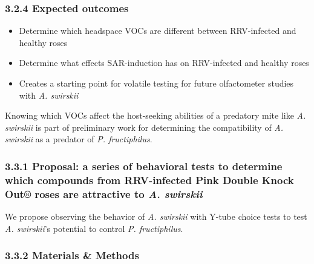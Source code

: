 \documentclass[12pt,final,CPage]{ufthesis}
\begin{document}
{  \hypertarget{expected-outcomes}{%
  \subsubsection{3.2.4 Expected outcomes}\label{expected-outcomes}}
  \begin{itemize}
  \item
    Determine which headspace VOCs are different between RRV-infected and healthy roses
  \item
    Determine what effects SAR-induction has on RRV-infected and healthy roses
  \item
    Creates a starting point for volatile testing for future olfactometer studies with \emph{A. swirskii}
  \end{itemize}
  Knowing which VOCs affect the host-seeking abilities of a predatory mite like \emph{A. swirskii} is part of preliminary work for determining the compatibility of \emph{A. swirskii} as a predator of \emph{P. fructiphilus}.

  \hypertarget{proposal-a-series-of-behavioral-tests-to-determine-which-compounds-from-rrv-infected-pink-double-knock-out-roses-are-attractive-to-a.-swirskii}{%
  \subsubsection{\texorpdfstring{3.3.1 Proposal: a series of behavioral tests to determine which compounds from RRV-infected Pink Double Knock Out® roses are attractive to \emph{A. swirskii}}{3.3.1 Proposal: a series of behavioral tests to determine which compounds from RRV-infected Pink Double Knock Out® roses are attractive to A. swirskii}}\label{proposal-a-series-of-behavioral-tests-to-determine-which-compounds-from-rrv-infected-pink-double-knock-out-roses-are-attractive-to-a.-swirskii}}

  We propose observing the behavior of \emph{A. swirskii} with Y-tube choice tests to test \emph{A. swirskii}'s potential to control \emph{P. fructiphilus}.

  \hypertarget{materials-methods-2}{%
  \subsubsection{3.3.2 Materials \& Methods}\label{materials-methods-2}}

}
\end{document}

